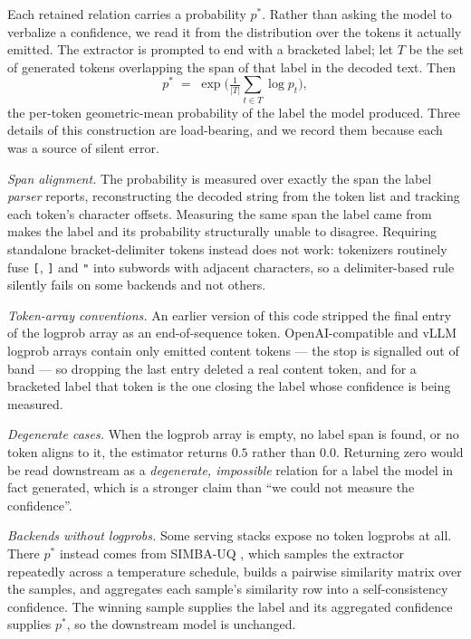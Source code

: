 Each retained relation carries a probability $p^\ast$. Rather than asking the model to verbalize a
confidence, we read it from the distribution over the tokens it actually emitted. The extractor is
prompted to end with a bracketed label; let $T$ be the set of generated tokens overlapping the
span of that label in the decoded text. Then
\begin{equation}
p^\ast \;=\; \exp\!\Big(\tfrac{1}{|T|}\textstyle\sum_{t\in T}\log p_t\Big),
\label{eq-pstar}
\end{equation}
the per-token geometric-mean probability of the label the model produced. Three details of this
construction are load-bearing, and we record them because each was a source of silent error.

\emph{Span alignment.} The probability is measured over exactly the span the label \emph{parser}
reports, reconstructing the decoded string from the token list and tracking each token's character
offsets. Measuring the same span the label came from makes the label and its probability
structurally unable to disagree. Requiring standalone bracket-delimiter tokens instead does not
work: tokenizers routinely fuse \texttt{[}, \texttt{]} and \texttt{"} into subwords with adjacent
characters, so a delimiter-based rule silently fails on some backends and not others.

\emph{Token-array conventions.} An earlier version of this code stripped the final entry of the
logprob array as an end-of-sequence token. OpenAI-compatible and vLLM logprob arrays contain only
emitted content tokens --- the stop is signalled out of band --- so dropping the last entry
deleted a real content token, and for a bracketed label that token is the one closing the label
whose confidence is being measured.

\emph{Degenerate cases.} When the logprob array is empty, no label span is found, or no token
aligns to it, the estimator returns $0.5$ rather than $0.0$. Returning zero would be read
downstream as a \emph{degenerate, impossible} relation for a label the model in fact generated,
which is a stronger claim than ``we could not measure the confidence''.

\emph{Backends without logprobs.} Some serving stacks expose no token logprobs at all. There
$p^\ast$ instead comes from SIMBA-UQ \citep{simbauq}, which samples the extractor repeatedly across
a temperature schedule, builds a pairwise similarity matrix over the samples, and aggregates each
sample's similarity row into a self-consistency confidence. The winning sample supplies the label
and its aggregated confidence supplies $p^\ast$, so the downstream model is unchanged.

